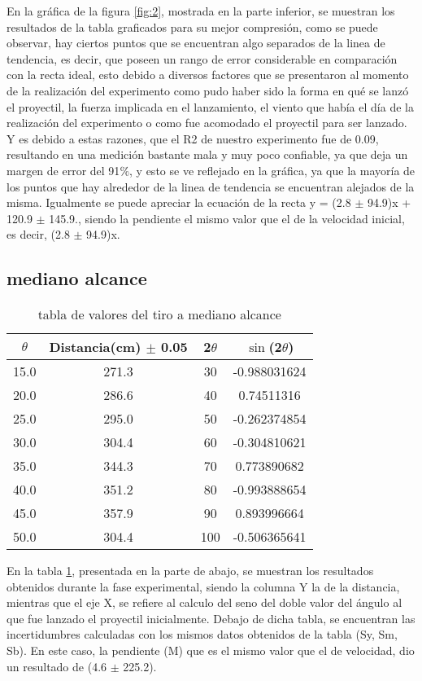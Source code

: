\documentclass{article}
\begin{document}
En la gráfica de la figura \ref{fig:2}, mostrada en la parte inferior, se muestran los resultados de la tabla graficados para su mejor compresión, como se puede observar, hay ciertos puntos que se encuentran algo separados de la linea de tendencia, es decir, que poseen un rango de error considerable en comparación con la recta ideal, esto debido a diversos factores que se presentaron al momento de la realización del experimento como pudo haber sido la forma en qué se lanzó el proyectil, la fuerza implicada en el lanzamiento, el viento que había el día de la realización del experimento o como fue acomodado el proyectil para ser lanzado. Y es debido a estas razones, que el R2 de nuestro experimento fue de 0.09, resultando en una medición bastante mala y muy poco confiable, ya que deja un margen de error del 91$\%$, y esto se ve reflejado en la gráfica, ya que la mayoría de los puntos que hay alrededor de la linea de tendencia se encuentran alejados de la misma. Igualmente se puede apreciar la ecuación de la recta y = (2.8 $\pm$ 94.9)x + 120.9 $\pm$ 145.9., siendo la pendiente el mismo valor que el de la velocidad inicial, es decir, (2.8 $\pm$ 94.9)x.
\subsection*{mediano alcance}

\begin{table}[H]
	\centering
	\begin{tabular}{|c|c|c|c|}
		\hline
		$\theta$ & Distancia(cm) $\pm$ 0.05 & 2$\theta$ & $\sin$(2$\theta$)\\
		\hline	
		15.0 & 271.3 & 30 & -0.988031624 \\
		\hline
20.0 & 286.6 & 40 &  0.74511316 \\
		\hline
25.0 & 295.0 & 50 & -0.262374854 \\
		\hline
30.0 & 304.4 & 60 & -0.304810621 \\
		\hline
35.0 & 344.3 & 70 & 0.773890682 \\
		\hline
40.0 & 351.2 & 80 & -0.993888654 \\
		\hline
45.0 & 357.9 & 90 & 0.893996664 \\
		\hline
50.0 & 304.4 & 100 & -0.506365641 \\
		\hline
	\end{tabular}
	\caption{tabla de valores del tiro a mediano alcance}
	\label{table:2}
\end{table}

En la tabla \ref{table:2}, presentada en la parte de abajo, se muestran los resultados obtenidos durante la fase experimental, siendo la columna Y la de la distancia, mientras que el eje X, se refiere al calculo del seno del doble valor del ángulo al que fue lanzado el proyectil inicialmente. Debajo de dicha tabla, se encuentran las incertidumbres calculadas con los mismos datos obtenidos de la tabla (Sy, Sm, Sb). En este caso, la pendiente (M) que es el mismo valor que el de velocidad, dio un resultado de (4.6 $\pm$ 225.2).
\end{document}
